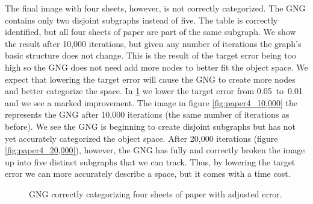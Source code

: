 \documentclass{article}
\renewcommand{\|}{\origbar} %
\begin{document}
The final image with four sheets, however, is not correctly categorized. The GNG contains only two disjoint subgraphs instead of five. The table is correctly identified, but all four sheets of paper are part of the same subgraph. We show the result after 10,000 iterations, but given any number of iterations the graph's basic structure does not change. This is the result of the target error being too high so the GNG does not need add more nodes to better fit the object space. We expect that lowering the target error will cause the GNG to create more nodes and better categorize the space. In \ref{fig:paper4Lowerror} we lower the target error from 0.05~to~0.01 and we see a marked improvement. The image in figure \ref{fig:paper4_10,000} the represents the GNG after 10,000 iterations (the same number of iterations as before). We see the GNG is beginning to create disjoint subgraphs but has not yet accurately categorized the object space. After 20,000 iterations (figure \ref{fig:paper4_20,000}), however, the GNG has fully and correctly broken the image up into five distinct subgraphs that we can track. Thus, by lowering the target error we can more accurately describe a space, but it comes with a time cost. 

\begin{figure}[h!]
  \centering

  \caption{GNG correctly categorizing four sheets of paper with adjusted error.}
  \label{fig:paper4Lowerror}
\end{figure}
\end{document}

